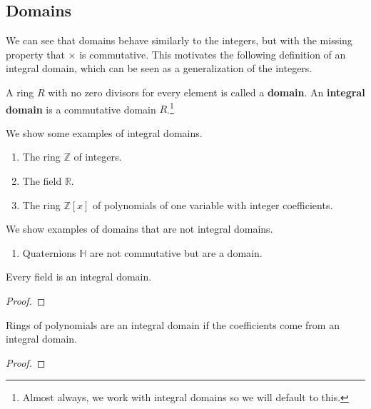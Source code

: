 \subsection{Domains}

  We can see that domains behave similarly to the integers, but with the missing property that $\times$ is commutative. This motivates the following definition of an integral domain, which can be seen as a generalization of the integers. 

  \begin{definition}[Domain]
    A ring $R$ with no zero divisors for every element is called a \textbf{domain}. An \textbf{integral domain} is a commutative domain $R$.\footnote{Almost always, we work with integral domains so we will default to this.} 
  \end{definition} 

  \begin{example}
    We show some examples of integral domains. 
    \begin{enumerate}
      \item The ring $\mathbb{Z}$ of integers. 
      \item The field $\mathbb{R}$. 
      \item The ring $\mathbb{Z}[x]$ of polynomials of one variable with integer coefficients. 
    \end{enumerate}
    We show examples of domains that are not integral domains. 
    \begin{enumerate}
      \item Quaternions $\mathbb{H}$ are not commutative but are a domain. 
    \end{enumerate}
  \end{example} 

  \begin{theorem}
    Every field is an integral domain. 
  \end{theorem}
  \begin{proof}
    
  \end{proof}

  \begin{theorem}
    Rings of polynomials are an integral domain if the coefficients come from an integral domain. 
  \end{theorem}
  \begin{proof}
    
  \end{proof} 

